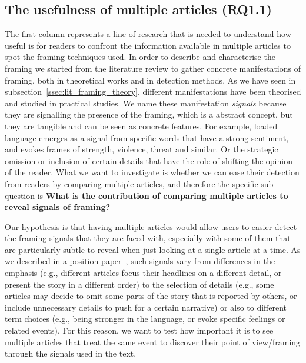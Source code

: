 

\subsection{The usefulness of multiple articles (RQ1.1)}
The first column represents a line of research that is needed to understand how useful is for readers to confront the information available in multiple articles to spot the framing techniques used.
In order to describe and characterise the framing we started from the literature review to gather concrete manifestations of framing, both in theoretical works and in detection methods.
As we have seen in subsection~\ref{ssec:lit_framing_theory}, different manifestations have been theorised and studied in practical studies.
We name these manifestation \emph{signals} because they are signalling the presence of the framing, which is a abstract concept, but they are tangible and can be seen as concrete features.
For example, loaded language emerges as a signal from specific words that have a strong sentiment, and evokes frames of strength, violence, threat and similar.
Or the strategic omission or inclusion of certain details that have the role of shifting the opinion of the reader.
What we want to investigate is whether we can ease their detection from readers by comparing multiple articles, 
and therefore the specific sub-question is \textbf{What is the contribution of comparing multiple articles to reveal signals of framing?}

Our hypothesis is that having multiple articles would allow users to easier detect the framing signals that they are faced with, especially with some of them that are particularly subtle to reveal when just looking at a single article at a time.
As we described in a position paper~\cite{mensio2020towards}, such signals vary from differences in the emphasis (e.g., different articles focus their headlines on a different detail, or present the story in a different order) to the selection of details (e.g., some articles may decide to omit some parts of the story that is reported by others, or include unnecessary details to push for a certain narrative) or also to different term choices (e.g., being stronger in the language, or evoke specific feelings or related events).
For this reason, we want to test how important it is to see multiple articles that treat the same event to discover their point of view/framing through the signals used in the text.

